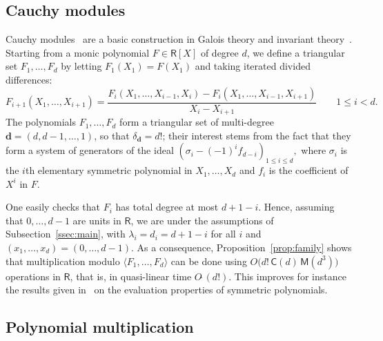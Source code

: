\documentclass[amsthm]{elsart}
\def\d {\ensuremath{\mathbf{d}}}
\def\C {\ensuremath{\mathsf{C}}}
\def\M {\ensuremath{\mathsf{M}}}
\def\rng {\ensuremath{\mathsf{R}}}
\theoremstyle{plain}
\begin{document}
\subsection{Cauchy modules}

Cauchy modules~\cite{ReVa99} are a basic construction in Galois theory
and invariant
theory~\cite{Sturmfels93,ReVa99,AbOrReVa04,ReYo06}. Starting from a
monic polynomial $F\in \rng[X]$ of degree $d$, we define a triangular
set $F_1,\dots,F_d$ by letting $F_1(X_1) = F(X_1)$ and taking iterated
divided differences:
$$ F_{i+1}(X_1,\dots,X_{i+1})
=
\frac{F_{i}(X_1,\dots,X_{i-1},X_i)-F_{i}(X_1,\dots,X_{i-1},X_{i+1})}{X_i-X_{i+1}}
\qquad 1 \le i < d.$$ The polynomials $F_1,\dots,F_d$ form a
triangular set of multi-degree $\d=(d,d-1,\dots,1)$, so that
$\delta_\d=d!$; their interest stems from the fact that they form a
system of generators of the ideal
$(\sigma_i - (-1)^i f_{d-i})_{1 \le i\le d},$
where $\sigma_i$ is the $i$th elementary symmetric polynomial
in $X_1,\dots,X_d$ and $f_i$ is the coefficient of $X^i$ in $F$.

One easily checks that $F_i$ has total degree at most $d+1-i$.  Hence,
assuming that $0,\dots,d-1$ are units in $\rng$, we are under the
assumptions of Subsection~\ref{ssec:main}, with $\lambda_i=d_i=d+1-i$
for all $i$ and $(x_1,\dots,x_d)=(0,\dots,d-1)$. As a consequence,
Proposition~\ref{prop:family} shows that multiplication modulo
$\langle F_1,\dots,F_d \rangle$ can be done using $O\big(d!\, \C(d)
\,\M(d^3)\big )$ operations in $\rng$, that is, in quasi-linear time
$O\tilde{~}(d!)$. This improves for instance the results given
in~\cite{GaScTh06} on the evaluation properties of symmetric
polynomials.



\subsection{Polynomial multiplication}
\end{document}
